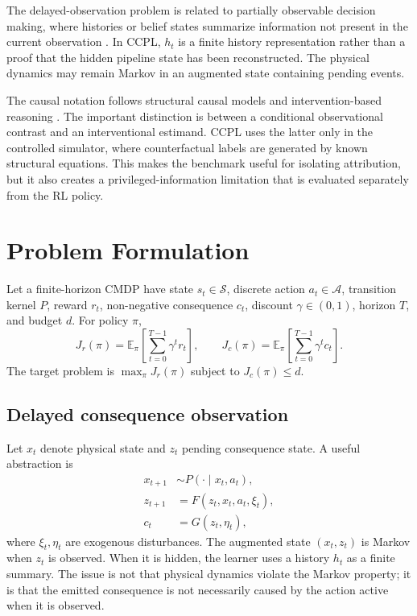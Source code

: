 \documentclass[10pt]{article}
\newcommand{\E}{\mathbb{E}}
\begin{document}
The delayed-observation problem is related to partially observable decision
making, where histories or belief states summarize information not present in
the current observation \citep{kaelbling1998}. In CCPL, $h_t$ is a finite
history representation rather than a proof that the hidden pipeline state has
been reconstructed. The physical dynamics may remain Markov in an augmented
state containing pending events.

The causal notation follows structural causal models and intervention-based
reasoning \citep{pearl2009,peters2017,scholkopf2021causality}. The important distinction is between a
conditional observational contrast and an interventional estimand. CCPL uses
the latter only in the controlled simulator, where counterfactual labels are
generated by known structural equations. This makes the benchmark useful for
isolating attribution, but it also creates a privileged-information limitation
that is evaluated separately from the RL policy.

\section{Problem Formulation}
Let a finite-horizon CMDP have state $s_t\in\mathcal{S}$, discrete action
$a_t\in\mathcal{A}$, transition kernel $P$, reward $r_t$, non-negative
consequence $c_t$, discount $\gamma\in(0,1)$, horizon $T$, and budget $d$.
For policy $\pi$,
\begin{equation}
J_r(\pi)=\E_\pi\left[\sum_{t=0}^{T-1}\gamma^t r_t\right],\qquad
J_c(\pi)=\E_\pi\left[\sum_{t=0}^{T-1}\gamma^t c_t\right].
\end{equation}
The target problem is $\max_\pi J_r(\pi)$ subject to $J_c(\pi)\le d$.

\subsection{Delayed consequence observation}
Let $x_t$ denote physical state and $z_t$ pending consequence state. A useful
abstraction is
\begin{align}
x_{t+1}&\sim P(\cdot\mid x_t,a_t),\\
z_{t+1}&=F(z_t,x_t,a_t,\xi_t),\\
c_t&=G(z_t,\eta_t),
\end{align}
where $\xi_t,\eta_t$ are exogenous disturbances. The augmented state
$(x_t,z_t)$ is Markov when $z_t$ is observed. When it is hidden, the learner
uses a history $h_t$ as a finite summary. The issue is not that physical
dynamics violate the Markov property; it is that the emitted consequence is
not necessarily caused by the action active when it is observed.
\end{document}

